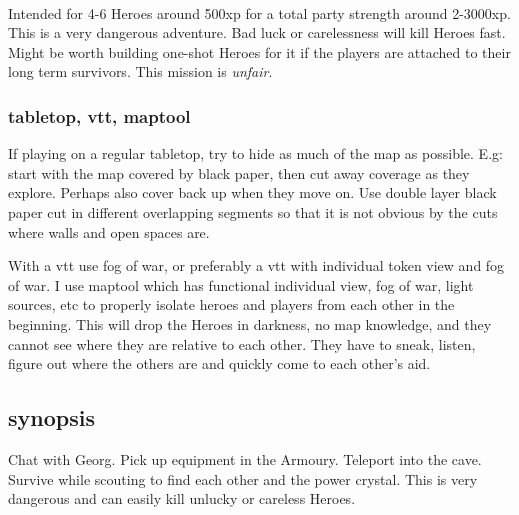 \

Intended for 4-6 Heroes around 500xp for a total party strength around 2-3000xp. This is a very dangerous adventure. Bad luck or carelessness will kill Heroes fast. Might be worth building one-shot Heroes for it if the players are attached to their long term survivors. This mission is \emph{unfair}.




\vspace{1.0\baselineskip}
\tableofcontents
{}
\vspace{2.0\baselineskip}




\subsubsection*{tabletop, vtt, maptool}
If playing on a regular tabletop, try to hide as much of the map as possible. E.g: start with the map covered by black paper, then cut away coverage as they explore. Perhaps also cover back up when they move on. Use double layer black paper cut in different overlapping segments so that it is not obvious by the cuts where walls and open spaces are.

With a vtt use fog of war, or preferably a vtt with individual token view and fog of war. I use maptool which has functional individual view, fog of war, light sources, etc to properly isolate heroes and players from each other in the beginning. This will drop the Heroes in darkness, no map knowledge, and they cannot see where they are relative to each other. They have to sneak, listen, figure out where the others are and quickly come to each other's aid.








\clearpage
\subsection*{synopsis}
Chat with Georg. Pick up equipment in the Armoury. Teleport into the cave. Survive while scouting to find each other and the power crystal. This is very dangerous and can easily kill unlucky or careless Heroes.

